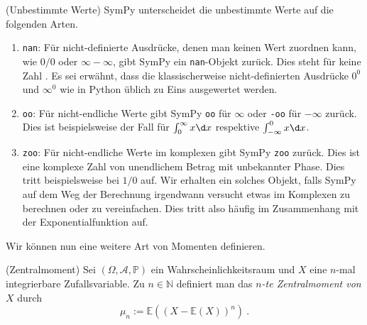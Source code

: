 \begin{Bemerkung}{(Unbestimmte Werte) \cite{SymPy}}
SymPy unterscheidet die unbestimmte Werte auf die folgenden Arten.
\begin{enumerate}[label=(\roman*)]
\item \lstinline|nan|: Für nicht-definierte Ausdrücke, denen man keinen Wert  zuordnen kann, wie $0/0$ oder $\infty - \infty$, gibt SymPy ein \lstinline|nan|-Objekt zurück. Dies steht für keine Zahl . Es sei erwähnt, dass die klassischerweise nicht-definierten Ausdrücke $0^0$ und $\infty^0$ wie in Python üblich zu Eins ausgewertet werden.

\item \lstinline|oo|: Für nicht-endliche Werte gibt SymPy \lstinline|oo| für $\infty$ oder \lstinline|-oo| für $- \infty$ zurück. Dies ist beispielsweise der Fall für $\int_0^\infty x \d x$ respektive $\int_{-\infty}^0 x \d x$.

\item \lstinline|zoo|: Für nicht-endliche Werte im komplexen gibt SymPy \lstinline|zoo| zurück. Dies ist eine komplexe Zahl von unendlichem Betrag mit unbekannter Phase. Dies tritt beispielsweise bei $1 / 0$ auf. Wir erhalten ein solches Objekt, falls SymPy auf dem Weg der Berechnung irgendwann versucht etwas im Komplexen zu berechnen oder zu vereinfachen. Dies tritt also häufig im Zusammenhang mit der Exponentialfunktion auf.
\end{enumerate}
\end{Bemerkung}

Wir können nun eine weitere Art von Momenten definieren.

\begin{Definition}{(Zentralmoment)}
Sei $(\Omega, \mathscr{A}, \mathbb{P})$ ein Wahrscheinlichkeitsraum und $X$ eine $n$-mal integrierbare Zufallsvariable. Zu $n \in \mathbb{N}$ definiert man das \textit{$n$-te Zentralmoment von $X$}  durch
\[\mu_n := \mathbb{E}\left((X - \mathbb{E}(X))^n\right)~.\]
\end{Definition}

